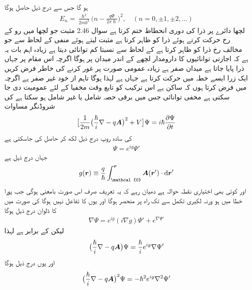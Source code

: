 ہو گا جس سے درج ذیل حاصل ہوگا 
\begin{align} 
E_n = \frac{\hslash^2}{2m b^2} \big ( n - \frac{q \Phi}{2 \pi \hslash} \big )^2, \quad (n = 0, \pm 1, \pm 2, \dotsc)
\end{align}
لچها دائرے پر ذرا کی دوری انحطاط ختم کرتا ہے سوال 2.46 مثبت  جو لچھا میں رو کے رخ حرکت کرتے ہوئے ذرا کو ظاہر کرتا ہے  مثبت لیتے ہوئے منفی  کے لحاظ سے جو مخالف رخ ذرا کو ظاہر کرتا ہے کے لحاظ سے نسبتا کم توانائی دیتا ہے زیادہ اہم بات یہ ہے کہ اجازتی توانائیوں کا دارومدار لچھے کے اندر میدان پر ہوگا اگرچہ اس مقام پر جہاں ذرا پایا جاتا ہے میدان صفر ہے زیادہ عمومی صورت پر غور کرنے کی خاطر فرض کریں ایک زرا ایسے خطہ میں حرکت کرتا ہے جہاں  ہے لہذا  ہوگا تاہم  از خود غیر صفر ہے اگرچہ میں فرض کرتا ہوں کہ  ساکن ہے اس ترکیب کو تابع وقت مخفیا کے لئے عمومیت دی جا سکتی ہے مخفی توانائی  جس میں برقی حصہ  شامل یا غیر شامل ہو سکتا ہے کی شروڈنگر مساوات 
\begin{align} 
\big [ \frac{1}{2m} \big ( \frac{\hslash}{i} \nabla - q {{\boldsymbol{A}}} \big )^2 + V \big ] \Psi = i \hslash \frac{\partial \Psi}{\partial t}
\end{align}
کی سادہ روپ درج ذیل لکھ کر حاصل کی جاسکتی ہے 
\begin{align}
\Psi = e^{i g} \Psi'
\end{align}
جہاں  درج ذیل ہے 
\begin{align}
g (\kvec{r}) \equiv \frac{q}{\hslash} \int_{\mathcal{0}}^{\kvec{r}} \kvec{A} (\kvec{r}') \cdot \dif \kvec{r}'
\end{align}
اور  کوئی بھی اختیاری نقطہ حوالہ ہے دھیان رہے کہ یہ تعریف صرف اس صورت بامعنی ہوگی جب پورا خطا میں  ہو ورنہ لکیری تکمل  سے  تک راہ پر منحصر ہوگا اور یوں  کا تفاعل نہیں ہوگا  کی صورت میں  کا ڈلوان درج ذیل ہوگا 
\begin{align*}
\nabla \Psi = e^{i g} (i \nabla g) \Psi' + e^{\nabla \Psi'}
\end{align*}
لیکن  کے برابر ہے لہذا 
\begin{align}
\big ( \frac{\hslash}{i} \nabla - q {{\boldsymbol{A}}} \big ) \Psi = \frac{\hslash}{i} e^{i g} \nabla \Psi'
\end{align}
اور یوں درج ذیل ہوگا 
\begin{align}
\big ( \frac{\hslash}{i} \nabla - q {{\boldsymbol{A}}} \big )^2 \Psi = - \hslash^2 e^{i g} \nabla^2 \Psi'
\end{align}
